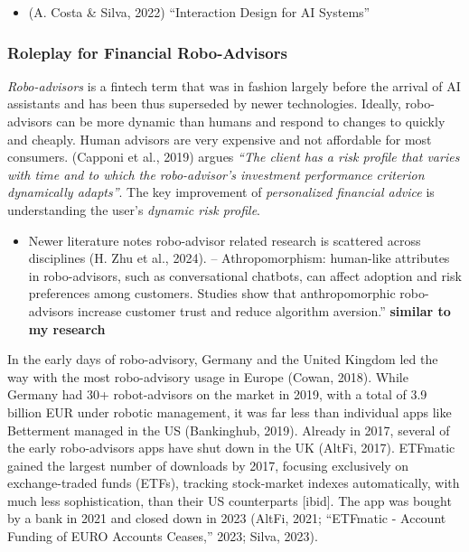 \documentclass[
  letterpaper,
  DIV=11,
  numbers=noendperiod]{scrartcl}
\providecommand{\tightlist}{%
  \setlength{\itemsep}{0pt}\setlength{\parskip}{0pt}}\usepackage{longtable,booktabs,array}
\begin{document}
\begin{itemize}
\tightlist
\item
  (A. Costa \& Silva, 2022) ``Interaction Design for AI Systems''
\end{itemize}

\subsubsection{Roleplay for Financial
Robo-Advisors}\label{roleplay-for-financial-robo-advisors}

\emph{Robo-advisors} is a fintech term that was in fashion largely
before the arrival of AI assistants and has been thus superseded by
newer technologies. Ideally, robo-advisors can be more dynamic than
humans and respond to changes to quickly and cheaply. Human advisors are
very expensive and not affordable for most consumers. (Capponi et al.,
2019) argues \emph{``The client has a risk profile that varies with time
and to which the robo-advisor's investment performance criterion
dynamically adapts''}. The key improvement of \emph{personalized
financial advice} is understanding the user's \emph{dynamic risk
profile}.

\begin{itemize}
\tightlist
\item
  Newer literature notes robo-advisor related research is scattered
  across disciplines (H. Zhu et al., 2024). -- Athropomorphism:
  human-like attributes in robo-advisors, such as conversational
  chatbots, can affect adoption and risk preferences among customers.
  Studies show that anthropomorphic robo-advisors increase customer
  trust and reduce algorithm aversion.'' \textbf{similar to my research}
\end{itemize}

In the early days of robo-advisory, Germany and the United Kingdom led
the way with the most robo-advisory usage in Europe (Cowan, 2018). While
Germany had 30+ robot-advisors on the market in 2019, with a total of
3.9 billion EUR under robotic management, it was far less than
individual apps like Betterment managed in the US (Bankinghub, 2019).
Already in 2017, several of the early robo-advisors apps have shut down
in the UK (AltFi, 2017). ETFmatic gained the largest number of downloads
by 2017, focusing exclusively on exchange-traded funds (ETFs), tracking
stock-market indexes automatically, with much less sophistication, than
their US counterparts {[}ibid{]}. The app was bought by a bank in 2021
and closed down in 2023 (AltFi, 2021; {``{ETFmatic} - {Account} Funding
of {EURO} Accounts Ceases,''} 2023; Silva, 2023).
\end{document}
